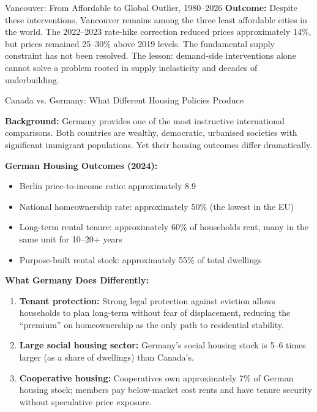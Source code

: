 \begin{casestudy}{Vancouver: From Affordable to Global Outlier, 1980--2026}
\textbf{Outcome:} Despite these interventions, Vancouver remains among the
three least affordable cities in the world. The 2022--2023 rate-hike correction
reduced prices approximately 14\%, but prices remained 25--30\% above 2019
levels. The fundamental supply constraint has not been resolved. The lesson:
demand-side interventions alone cannot solve a problem rooted in supply
inelasticity and decades of underbuilding.
\end{casestudy}

\begin{casestudy}{Canada vs. Germany: What Different Housing Policies Produce}

\textbf{Background:} Germany provides one of the most instructive international
comparisons. Both countries are wealthy, democratic, urbanised societies with
significant immigrant populations. Yet their housing outcomes differ dramatically.

\textbf{German Housing Outcomes (2024):}
\begin{itemize}
  \item Berlin price-to-income ratio: approximately 8.9
  \item National homeownership rate: approximately 50\% (the lowest in the EU)
  \item Long-term rental tenure: approximately 60\% of households rent,
        many in the same unit for 10--20+ years
  \item Purpose-built rental stock: approximately 55\% of total dwellings
\end{itemize}

\textbf{What Germany Does Differently:}
\begin{enumerate}
  \item \textbf{Tenant protection:} Strong legal protection against eviction
        allows households to plan long-term without fear of displacement,
        reducing the ``premium'' on homeownership as the only path to
        residential stability.

  \item \textbf{Large social housing sector:} Germany's social housing stock
        is 5--6 times larger (as a share of dwellings) than Canada's.

  \item \textbf{Cooperative housing:} Cooperatives own approximately 7\%
        of German housing stock; members pay below-market cost rents and
        have tenure security without speculative price exposure.


\end{enumerate}
\end{casestudy}
